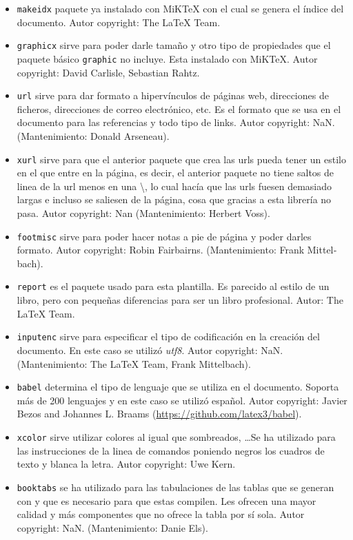 \begin{itemize}
\begin{itemize}
		\item \texttt{makeidx} paquete ya instalado con MiKTeX con el cual se genera el índice del documento. Autor copyright: The LaTeX Team.
		\item \texttt{graphicx} sirve para poder darle tamaño y otro tipo de propiedades que el paquete básico \texttt{graphic} no incluye. Esta instalado con MiKTeX. Autor copyright: David Carlisle, Se­bas­tian Rahtz.
		\item \texttt{url} sirve para dar formato a hipervínculos de páginas web, direcciones de ficheros, direcciones de correo electrónico, etc. Es el formato que se usa en el documento para las referencias y todo tipo de links. Autor copyright: NaN. (Mantenimiento: Don­ald Arse­neau).
		\item \texttt{xurl} sirve para que el anterior paquete que crea las urls pueda tener un estilo en el que entre en la página, es decir, el anterior paquete no tiene saltos de linea de la url menos en una \textbackslash , lo cual hacía que las urls fuesen demasiado largas e incluso se saliesen de la página, cosa que gracias a esta  librería no pasa. Autor copyright: Nan (Mantenimiento: Her­bert Voss).
		\item \texttt{footmisc} sirve para poder hacer notas a pie de página y poder darles formato. Autor copyright: Robin Fair­bairns. (Mantenimiento: Frank Mit­tel­bach).
		\item \texttt{report} es el paquete usado para esta plantilla. Es parecido al estilo de un libro, pero con pequeñas diferencias para ser un libro profesional. Autor: The LaTeX Team.
		\item \texttt{inputenc} sirve para especificar el tipo de codificación en la creación del documento. En este caso se utilizó \textit{utf8}. Autor copyright: NaN. (Mantenimiento: The LaTeX Team, Frank Mit­tel­bach).
		\item \texttt{babel} determina el tipo de lenguaje que se utiliza en el documento. Soporta más de 200 lenguajes y en este caso se utilizó español. Autor copyright: Javier Be­zos and Jo­hannes L. Braams (\url{https://github.com/latex3/babel}).
		\item \texttt{xcolor} sirve utilizar colores al igual que sombreados, \dots Se ha utilizado para las instrucciones de la linea de comandos poniendo negros los cuadros de texto y blanca la letra. Autor copyright: Uwe Kern.
		\item \texttt{booktabs} se ha utilizado para las tabulaciones de las tablas que se generan con \textit{} y que es necesario para que estas compilen. Les ofrecen una mayor calidad y más componentes que no ofrece la tabla por sí sola. Autor copyright: NaN. (Mantenimiento: Danie Els).

\end{itemize}
\end{itemize}
